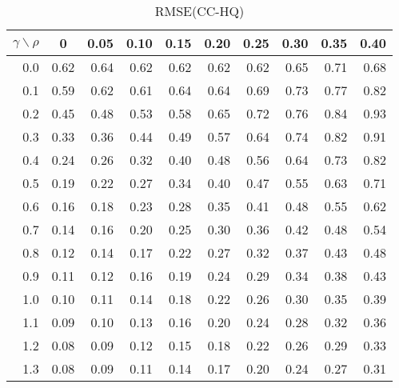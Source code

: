 \documentclass[12pt]{article}
\begin{document}
\begin{table}[!tbp]
\caption{RMSE(CC-HQ)}
 \begin{center}
 \begin{tabular}{r|rrrrrrrrr}\hline\hline
\multicolumn{1}{c|}{$\gamma\backslash\rho$}&\multicolumn{1}{c}{0}&\multicolumn{1}{c}{0.05}&\multicolumn{1}{c}{0.10}&\multicolumn{1}{c}{0.15}&\multicolumn{1}{c}{0.20}&\multicolumn{1}{c}{0.25}&\multicolumn{1}{c}{0.30}&\multicolumn{1}{c}{0.35}&\multicolumn{1}{c}{0.40}\tabularnewline
\hline


0.0&0.62&0.64&0.62&0.62&0.62&0.62&0.65&0.71&0.68\tabularnewline
0.1&0.59&0.62&0.61&0.64&0.64&0.69&0.73&0.77&0.82\tabularnewline
0.2&0.45&0.48&0.53&0.58&0.65&0.72&0.76&0.84&0.93\tabularnewline
0.3&0.33&0.36&0.44&0.49&0.57&0.64&0.74&0.82&0.91\tabularnewline
0.4&0.24&0.26&0.32&0.40&0.48&0.56&0.64&0.73&0.82\tabularnewline
0.5&0.19&0.22&0.27&0.34&0.40&0.47&0.55&0.63&0.71\tabularnewline
0.6&0.16&0.18&0.23&0.28&0.35&0.41&0.48&0.55&0.62\tabularnewline
0.7&0.14&0.16&0.20&0.25&0.30&0.36&0.42&0.48&0.54\tabularnewline
0.8&0.12&0.14&0.17&0.22&0.27&0.32&0.37&0.43&0.48\tabularnewline
0.9&0.11&0.12&0.16&0.19&0.24&0.29&0.34&0.38&0.43\tabularnewline
1.0&0.10&0.11&0.14&0.18&0.22&0.26&0.30&0.35&0.39\tabularnewline
1.1&0.09&0.10&0.13&0.16&0.20&0.24&0.28&0.32&0.36\tabularnewline
1.2&0.08&0.09&0.12&0.15&0.18&0.22&0.26&0.29&0.33\tabularnewline
1.3&0.08&0.09&0.11&0.14&0.17&0.20&0.24&0.27&0.31\tabularnewline
\hline
\end{tabular}

\end{center}

\end{table}

%
\end{document}

